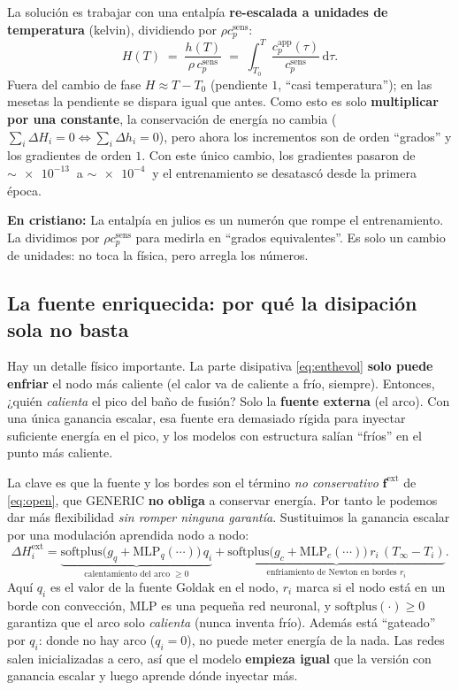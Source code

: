 \documentclass[11pt]{article}
\newcommand{\dd}{\mathrm{d}}
\newcommand{\Tinf}{T_{\infty}}
\newcommand{\cpapp}{c_p^{\mathrm{app}}}
\newcommand{\cpsens}{c_p^{\mathrm{sens}}}
\theoremstyle{definition}
\theoremstyle{plain}
\newcommand{\dummies}[1]{%
  \par\smallskip\noindent
  \colorbox{yellow!18}{\parbox{\dimexpr\linewidth-2\fboxsep}{%
  \small\textbf{En cristiano:} #1}}\par\smallskip}
\begin{document}
La solución es trabajar con una entalpía \textbf{re-escalada a unidades de
temperatura} (kelvin), dividiendo por $\rho\cpsens$:
\begin{equation}
  H(T) \;=\; \frac{h(T)}{\rho\,\cpsens}
  \;=\; \int_{T_0}^{T}\frac{\cpapp(\tau)}{\cpsens}\,\dd\tau .
  \label{eq:Heq}
\end{equation}
Fuera del cambio de fase $H\approx T-T_0$ (pendiente $1$, ``casi temperatura'');
en las mesetas la pendiente se dispara igual que antes. Como esto es solo
\textbf{multiplicar por una constante}, la conservación de energía no cambia
($\sum_i\Delta H_i=0\Leftrightarrow\sum_i\Delta h_i=0$), pero ahora los incrementos
son de orden ``grados'' y los gradientes de orden $1$. Con este único cambio, los
gradientes pasaron de $\sim\!\SI{e-13}{}$ a $\sim\!\SI{e-4}{}$ y el entrenamiento se
desatascó desde la primera época.

\dummies{La entalpía en julios es un numerón que rompe el entrenamiento. La
dividimos por $\rho\cpsens$ para medirla en ``grados equivalentes''. Es solo un
cambio de unidades: no toca la física, pero arregla los números.}

\subsection{La fuente enriquecida: por qué la disipación sola no basta}

Hay un detalle físico importante. La parte disipativa \eqref{eq:enthevol}
\textbf{solo puede enfriar} el nodo más caliente (el calor va de caliente a frío,
siempre). Entonces, ¿quién \emph{calienta} el pico del baño de fusión? Solo la
\textbf{fuente externa} (el arco). Con una única ganancia escalar, esa fuente era
demasiado rígida para inyectar suficiente energía en el pico, y los modelos con
estructura salían ``fríos'' en el punto más caliente.

La clave es que la fuente y los bordes son el término \emph{no conservativo}
$\bm f^{\mathrm{ext}}$ de \eqref{eq:open}, que GENERIC \textbf{no obliga} a
conservar energía. Por tanto le podemos dar más flexibilidad \emph{sin romper
ninguna garantía}. Sustituimos la ganancia escalar por una modulación aprendida
nodo a nodo:
\begin{equation}
  \Delta H_i^{\mathrm{ext}}
  = \underbrace{\mathrm{softplus}\!\big(g_q+\mathrm{MLP}_q(\cdots)\big)\,q_i}
    _{\text{calentamiento del arco }\ge 0}
  + \underbrace{\mathrm{softplus}\!\big(g_c+\mathrm{MLP}_c(\cdots)\big)\,r_i\,(\Tinf-T_i)}
    _{\text{enfriamiento de Newton en bordes }r_i}.
  \label{eq:enriched}
\end{equation}
Aquí $q_i$ es el valor de la fuente Goldak en el nodo, $r_i$ marca si el nodo está
en un borde con convección, $\mathrm{MLP}$ es una pequeña red neuronal, y
$\mathrm{softplus}(\cdot)\ge0$ garantiza que el arco solo \emph{calienta} (nunca
inventa frío). Además está ``gateado'' por $q_i$: donde no hay arco ($q_i=0$), no
puede meter energía de la nada. Las redes salen inicializadas a cero, así que el
modelo \textbf{empieza igual} que la versión con ganancia escalar y luego aprende
dónde inyectar más.
\end{document}
